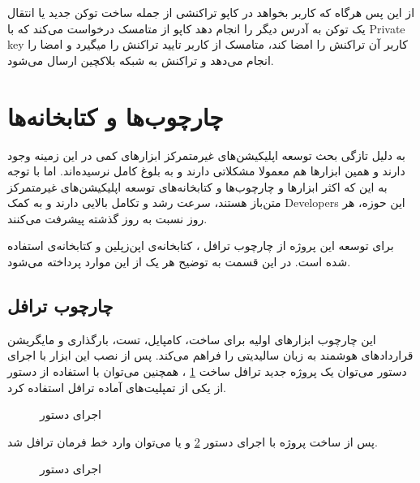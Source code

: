 از این پس هرگاه که کاربر بخواهد در کاپو تراکنشی از جمله
ساخت توکن جدید یا انتقال یک توکن به آدرس دیگر را انجام دهد کاپو از متامسک درخواست می‌کند که با
\gls{Private key}
کاربر آن تراکنش را امضا کند،
متامسک از کاربر تایید تراکنش را میگیرد و امضا را انجام می‌دهد و تراکنش به شبکه بلاکچین ارسال می‌شود.


\section{چارچوب‌ها و کتابخانه‌ها}
به دلیل تازگی بحث توسعه اپلیکیشن‌های غیرمتمرکز ابزارهای کمی در این زمینه وجود دارند
و همین ابزارها هم معمولا مشکلاتی دارند و به بلوغ کامل نرسیده‌اند.
اما با توجه به این که اکثر ابزارها و چارچوب‌ها و کتابخانه‌های توسعه اپلیکیشن‌های غیرمتمرکز متن‌باز هستند،
سرعت رشد و تکامل بالایی دارند و به کمک
\glspl{Developer}
این حوزه، هر روز نسبت به روز گذشته پیشرفت می‌کنند.

برای توسعه این پروژه از
چارچوب ترافل
،
کتابخانه‌ی اپن‌زپلین
و کتابخانه‌ی
استفاده شده است. در این قسمت به توضیح هر یک از این موارد پرداخته می‌شود.

\subsection{چارچوب ترافل}
این چارچوب ابزارهای اولیه برای ساخت، کامپایل، تست، بارگذاری
و مایگریشن قراردادهای هوشمند به زبان سالیدیتی را فراهم می‌کند.
پس از نصب این ابزار با اجرای دستور
می‌توان یک پروژه جدید ترافل ساخت
\ref{fig:truffle-init}
، همچنین می‌توان با استفاده از دستور
از یکی از تمپلیت‌های آماده ترافل استفاده کرد.

\begin{figure}[H]
\centerline{}
\caption{اجرای دستور }
\label{fig:truffle-init}
\end{figure}

پس از ساخت پروژه با اجرای دستور
\ref{fig:truffle-develop}
و یا
 می‌توان وارد خط فرمان ترافل شد.

\begin{figure}[H]
\centerline{}
\caption{اجرای دستور }
\label{fig:truffle-develop}
\end{figure}

